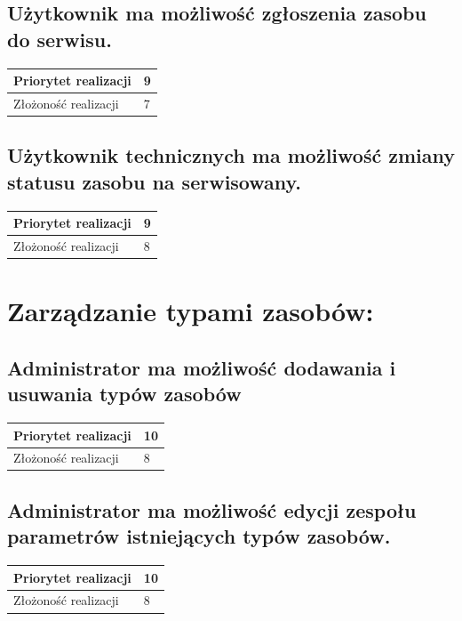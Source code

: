 \documentclass[11pt, a4paper, oneside]{report}
\begin{document}
\subsection{Użytkownik ma możliwość zgłoszenia zasobu do serwisu.}
\begin{center}
\begin{tabular}[c]{| l | l | }
  \hline			
  Priorytet realizacji & 9 \\
  \hline
  Złożoność realizacji & 7 \\
  \hline  
\end{tabular}
\end{center}
\subsection{Użytkownik technicznych ma możliwość zmiany statusu zasobu na serwisowany.}
\begin{center}
\begin{tabular}[c]{| l | l | }
  \hline			
  Priorytet realizacji & 9 \\
  \hline
  Złożoność realizacji & 8 \\
  \hline  
\end{tabular}
\end{center}

\section{Zarządzanie typami zasobów:}
\subsection{Administrator ma możliwość dodawania i usuwania typów zasobów}
\begin{center}
\begin{tabular}[c]{| l | l | }
  \hline			
  Priorytet realizacji & 10 \\
  \hline
  Złożoność realizacji & 8 \\
  \hline  
\end{tabular}
\end{center}

\subsection{Administrator ma możliwość edycji zespołu parametrów istniejących typów zasobów.}
\begin{center}
\begin{tabular}[c]{| l | l | }
  \hline			
  Priorytet realizacji & 10 \\
  \hline
  Złożoność realizacji & 8 \\
  \hline  
\end{tabular}
\end{center}
\end{document}
